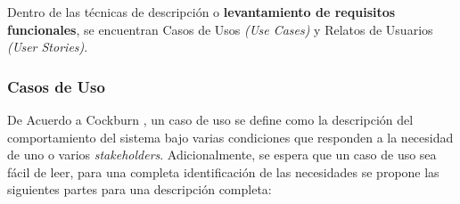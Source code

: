 Dentro de las técnicas de descripción o \textbf{levantamiento de requisitos funcionales}, se encuentran Casos de Usos \textit{(Use Cases)} y Relatos de Usuarios \textit{(User Stories)}.

\subsubsection{Casos de Uso \label{sec:use_cases}}

De Acuerdo a Cockburn \cite{uses_cases_writing}, un caso de uso se define como la descripción del comportamiento del sistema bajo varias condiciones que responden a la necesidad de uno o varios \textit{stakeholders}. Adicionalmente, se espera que un caso de uso sea fácil de leer, para una completa identificación de las necesidades se propone las siguientes partes para una descripción completa:

